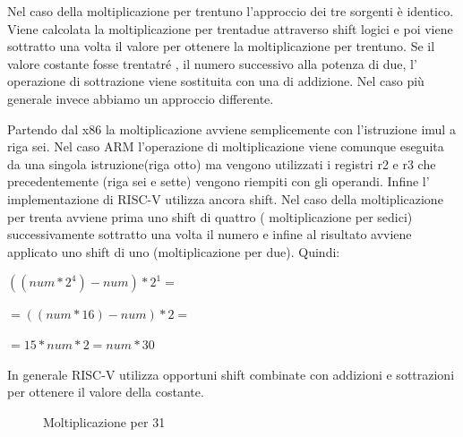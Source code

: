 \documentclass[12pt,a4paper]{report}
\begin{document}
\vspace{0.3 cm}

Nel caso della moltiplicazione per trentuno l'approccio dei tre sorgenti è identico. Viene calcolata la moltiplicazione per trentadue attraverso shift logici e poi viene sottratto una volta il valore per ottenere la moltiplicazione per trentuno. Se il valore costante fosse trentatré , il numero successivo alla potenza di due, l' operazione di sottrazione viene sostituita con una di addizione. Nel caso più generale invece abbiamo un approccio differente.

Partendo dal x86 la moltiplicazione avviene semplicemente con l'istruzione imul a riga sei.  Nel caso ARM l'operazione di moltiplicazione viene comunque eseguita da una singola istruzione(riga otto) ma vengono utilizzati i registri r2 e r3 che precedentemente (riga sei e sette) vengono riempiti con gli operandi. Infine l' implementazione di RISC-V utilizza ancora shift. Nel caso della moltiplicazione per trenta avviene prima uno shift di quattro ( moltiplicazione per sedici) successivamente sottratto una volta il numero e infine al risultato avviene applicato uno shift di uno (moltiplicazione per due).  Quindi: 
\begin{center}
	\vspace{0.2cm}
$((num * 2^4) - num ) * 2^1 = $ 

$ =((num * 16 ) - num ) * 2 =$ 

$ = 15 * num * 2 =  num *30 $ 
\end{center}


\vspace{0.2 cm}
In generale RISC-V utilizza opportuni shift combinate con addizioni e sottrazioni per ottenere il valore della costante.

\begin{figure}[ht]

     \begin{subfigure}[b]{0.3\textwidth}
  
        
        \label{Code:Mul31RISC}


     \end{subfigure}
     \hfill
     \begin{subfigure}[b]{0.3\textwidth}
         
          	
		
		 \label{Code:Mul31ARM}
     \end{subfigure}
     \hfill
     \begin{subfigure}[b]{0.3\textwidth}
         
          
	
	 \label{Code:Mul31X86}
     \end{subfigure}
     \caption{Moltiplicazione per 31}
     \end{figure}
\end{document}
